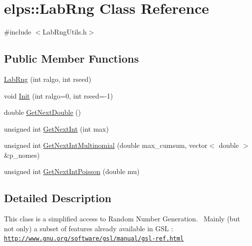\hypertarget{classelps_1_1_lab_rng}{\section{elps\+:\+:Lab\+Rng Class Reference}
\label{classelps_1_1_lab_rng}
}


{\ttfamily \#include $<$Lab\+Rng\+Utils.\+h$>$}

\subsection*{Public Member Functions}
\begin{DoxyCompactItemize}
\item 
\hyperlink{classelps_1_1_lab_rng_aeec9c09dc936c8b72e34e3bc7a34f41f}{Lab\+Rng} (int ralgo, int rseed)
\item 
void \hyperlink{classelps_1_1_lab_rng_a63daffcb37fcfda8aa4c82418a2114f4}{Init} (int ralgo=0, int rseed=-\/1)
\item 
double \hyperlink{classelps_1_1_lab_rng_a1a8bf0a71e335dc2de2aa8621e75a110}{Get\+Next\+Double} ()
\item 
unsigned int \hyperlink{classelps_1_1_lab_rng_a3603daf5dfa58a4e8b7c6c7c40da5c1a}{Get\+Next\+Int} (int max)
\item 
unsigned int \hyperlink{classelps_1_1_lab_rng_a38a77355f1cf17a52e2807a0a7223df3}{Get\+Next\+Int\+Multinomial} (double max\+\_\+cumsum, vector$<$ double $>$ \&p\+\_\+nomes)
\item 
unsigned int \hyperlink{classelps_1_1_lab_rng_a15d968113695b7780304b0c20c8acc50}{Get\+Next\+Int\+Poisson} (double mu)
\end{DoxyCompactItemize}


\subsection{Detailed Description}
This class is a simplified access to Random Number Generation.~\newline
 Mainly (but not only) a subset of features already available in G\+S\+L \+:~\newline
 \href{http://www.gnu.org/software/gsl/manual/gsl-ref.html}{\tt http\+://www.\+gnu.\+org/software/gsl/manual/gsl-\/ref.\+html} 


